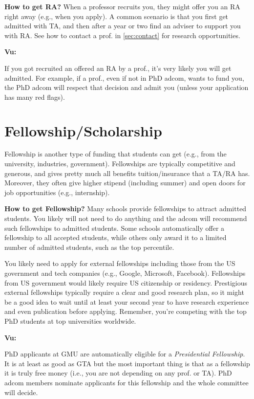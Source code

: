 \documentclass[oneside,11pt]{memoir}
\newenvironment{commentbox}[1][]{
  \small
  \begin{mybox}
    {\small \textbf{#1}}
  }{
  \end{mybox}
}
\begin{document}
\textbf{How to get RA?} When a professor recruits you, they might offer you an RA right away (e.g., when you apply).  A common scenario is that you first get admitted with TA, and then after a year or two find an adviser to support you with RA. See how to contact a prof. in \autoref{sec:contact} for research opportunities.


\begin{commentbox}[Vu:]
  If you got recruited an offered an RA by a prof., it's very likely you will get admitted.  For example, if a prof., even if not in PhD adcom, wants to fund you, the PhD adcom will respect that decision and admit you (unless your application has many red flags).
\end{commentbox}

\section{Fellowship/Scholarship}

Fellowship is another type of funding that students can get (e.g., from the university, industries, government).
Fellowships are typically competitive and generous, and gives pretty much all benefits tuition/insurance that a TA/RA has.  Moreover, they often give higher stipend (including summer) and open doors for job opportunities (e.g., internship).


\textbf{How to get Fellowship?}   Many schools provide fellowships to attract admitted students. You likely will not need to do anything and the adcom will recommend such fellowships to admitted students. Some schools automatically offer a fellowship to all accepted students, while others only award it to a limited number of admitted students, such as the top percentile.

You likely need to apply for external fellowships including those from the US government and tech companies (e.g., Google, Microsoft, Facebook).  Fellowships from US government would likely require US citizenship or residency. %
Prestigious external fellowships typically require a clear and good research plan, so it might be a good idea to wait until at least your second year to have research experience and even publication before applying. Remember, you're competing with the top PhD students at top universities worldwide.


\begin{commentbox}[Vu:]
  PhD applicants at GMU are automatically eligible for a \emph{Presidential Fellowship}.  It is at least as good as GTA but the most important thing is that as a fellowship it is truly free money (i.e., you are not depending on any prof. or TA).  PhD adcom members nominate applicants for this fellowship and the whole committee will decide.
\end{commentbox}
\end{document}
